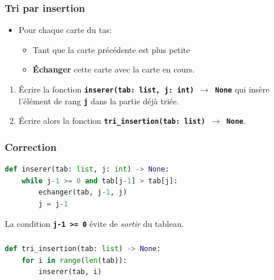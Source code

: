 \documentclass[svgnames,11pt]{beamer}
\begin{document}
\begin{frame}
    \frametitle{Tri par insertion}
    \begin{itemize}
        \item Pour chaque carte du tas:
              \begin{itemize}
                  \item Tant que la carte précédente est plus petite
                  \item \textbf{Échanger} cette carte avec la carte en cours.
              \end{itemize}

    \end{itemize}
    \begin{activite}
        \begin{enumerate}
            \item Écrire la fonction \textbf{\texttt{inserer(tab: list, j: int) $\rightarrow$ None}} qui insère l'élément de rang \textbf{\texttt{j}} dans la partie déjà triée.
            \item Écrire alors la fonction \textbf{\texttt{tri\_insertion(tab: list) $\rightarrow$ None}}.
        \end{enumerate}
    \end{activite}

\end{frame}
\begin{frame}[fragile]
    \frametitle{Correction}

\begin{center}
\begin{lstlisting}[language=Python , basicstyle=\ttfamily\small, xleftmargin=2em, xrightmargin=0em]
def inserer(tab: list, j: int) -> None:
    while j-1 >= 0 and tab[j-1] > tab[j]:
        echanger(tab, j-1, j)
        j = j-1
\end{lstlisting}
\end{center}
\begin{aretenir}[Remarque]
La condition \textbf{\texttt{j-1 >= 0}} évite de \emph{sortir} du tableau.
\end{aretenir}
\end{frame}
\begin{frame}[fragile]
    \frametitle{}

\begin{center}
\begin{lstlisting}[language=Python , basicstyle=\ttfamily\small, xleftmargin=2em, xrightmargin=0em]
def tri_insertion(tab: list) -> None:
    for i in range(len(tab)):
        inserer(tab, i)
\end{lstlisting}
\end{center}

\end{frame}
\end{document}
